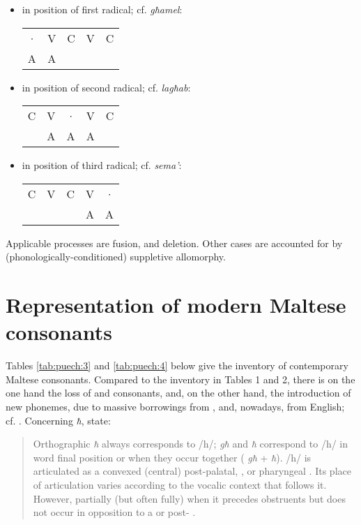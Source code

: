 \documentclass[output=paper]{langsci/langscibook}
\begin{document}
\begin{itemize}
 \item 
 in position of first radical; cf.  \textit{għamel}:  \\
\begin{tabular}{|lllll|}
\hline
  · &  V &  C &  V &  C \\
  A & A &      &     & \\
\hline
\end{tabular}  

\item  in position of second radical; cf.  \textit{lagħab}:  \\
\begin{tabular}{|lllll|}
\hline
  C & V & · & V & C \\
      & A & A & A &     \\
\hline
\end{tabular}  

\item in position of third radical; cf.  \textit{sema’}:  \\
\begin{tabular}{|lllll|}
\hline
  C  & V & C & V &  ·\\
       &    &     & A & A \\
\hline
\end{tabular}       
\end{itemize}


Applicable  processes are fusion,  and deletion. Other cases are accounted for by (phonologically-conditioned) suppletive allomorphy. 

\section{Representation of modern Maltese consonants}\label{sec:puech:9}

Tables \ref{tab:puech:3} and \ref{tab:puech:4} below give the inventory of contemporary Maltese consonants. Compared to the inventory in Tables 1 and 2, there is on the one hand the loss of  and  consonants, and, on the other hand, the introduction of new phonemes, due to massive borrowings from ,  and, nowadays, from English; cf. \citet{Mifsud1995loanverbs}. Concerning \textit{ħ},  \citet[301]{BorgAzzopardi1997} state: 

\begin{quote}
Orthographic \textit{ħ} always corresponds to /h/;  \textit{għ} and \textit{ħ} correspond to /h/ in word final position or when they occur together ( \textit{għ} + \textit{ħ}). /h/ is articulated as a convexed (central) post-palatal, ,  or pharyngeal . Its place of articulation varies according to the vocalic context that follows it. However, partially (but often fully)  when it precedes  obstruents but does not occur in opposition to a   or post- . 
\end{quote}
\end{document}

